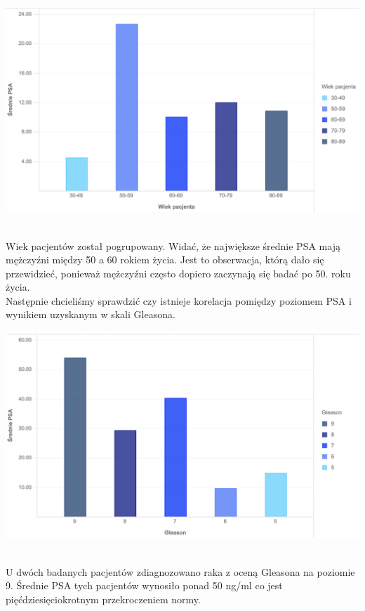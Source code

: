 \documentclass[a4paper,11pt,twoside]{report}
\theoremstyle{definition}
\begin{document}
\begin{minipage}{\linewidth}
	\centering
	\includegraphics[width=\textwidth]{Wykresy/AgePSA.png}
\end{minipage}
\\
Wiek pacjentów został pogrupowany. Widać, że największe średnie PSA mają mężczyźni między 50 a 60 rokiem życia. Jest to obserwacja, którą dało się przewidzieć, ponieważ mężczyźni często dopiero zaczynają się badać po 50. roku życia. 
\\
Następnie chcieliśmy sprawdzić czy istnieje korelacja pomiędzy poziomem PSA i wynikiem uzyskanym w skali Gleasona.
\\
\begin{minipage}{\linewidth}
	\centering
	\includegraphics[width=\textwidth]{Wykresy/PSAGleason.png}
\end{minipage}
\\
U dwóch badanych pacjentów zdiagnozowano raka z oceną Gleasona na poziomie 9. Średnie PSA tych pacjentów wynosiło ponad 50 ng/ml co jest pięćdziesięciokrotnym przekroczeniem normy.
\end{document}

